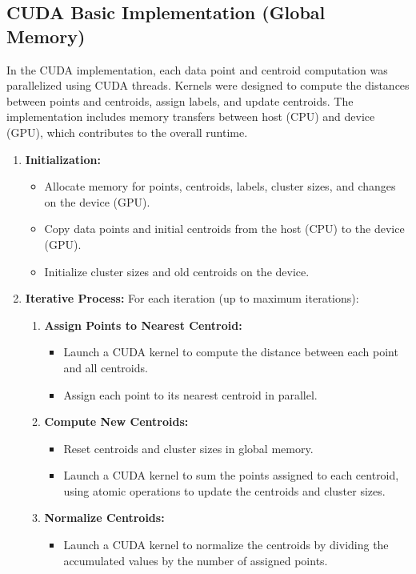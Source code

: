 \documentclass[letterpaper,12pt]{article}
\theoremstyle{remark}
\begin{document}
\subsection{CUDA Basic Implementation (Global Memory)}
In the CUDA implementation, each data point and centroid computation was parallelized using CUDA threads. Kernels were designed to compute the distances between points and centroids, assign labels, and update centroids. The implementation includes memory transfers between host (CPU) and device (GPU), which contributes to the overall runtime.


\begin{enumerate}
    \item \textbf{Initialization:}
    \begin{itemize}
        \item Allocate memory for points, centroids, labels, cluster sizes, and changes on the device (GPU).
        \item Copy data points and initial centroids from the host (CPU) to the device (GPU).
        \item Initialize cluster sizes and old centroids on the device.
    \end{itemize}

    \item \textbf{Iterative Process:} For each iteration (up to maximum iterations):
    \begin{enumerate}
        \item \textbf{Assign Points to Nearest Centroid:}
        \begin{itemize}
            \item Launch a CUDA kernel to compute the distance between each point and all centroids.
            \item Assign each point to its nearest centroid in parallel.
        \end{itemize}
        
        \item \textbf{Compute New Centroids:}
        \begin{itemize}
            \item Reset centroids and cluster sizes in global memory.
            \item Launch a CUDA kernel to sum the points assigned to each centroid, using atomic operations to update the centroids and cluster sizes.
        \end{itemize}
        
        \item \textbf{Normalize Centroids:}
        \begin{itemize}
            \item Launch a CUDA kernel to normalize the centroids by dividing the accumulated values by the number of assigned points.
        \end{itemize}
        

\end{enumerate}
\end{enumerate}
\end{document}
